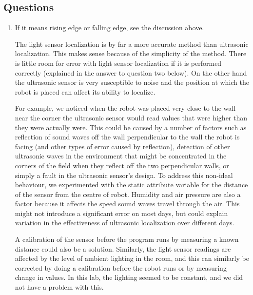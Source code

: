 \documentclass[twocolumn]{article}
\begin{document}

\subsection{Questions}

\begin{enumerate}

\item
If it means rising edge or falling edge, see the discussion above.

The light sensor localization is by far a more accurate method than ultrasonic localization. This makes sense because of the simplicity of the method. There is little room for error with light sensor localization if it is performed correctly (explained in the answer to question two below). On the other hand the ultrasonic sensor is very susceptible to noise and the position at which the robot is placed can affect its ability to localize.

For example, we noticed when the robot was placed very close to the wall near the corner the ultrasonic sensor would read values that were higher than they were actually were. This could be caused by a number of factors such as reflection of sound waves off the wall perpendicular to the wall the robot is facing (and other types of error caused by reflection), detection of other ultrasonic waves in the environment that might be concentrated in the corners of the field when they reflect off the two perpendicular walls, or simply a fault in the ultrasonic sensor's design. To address this non-ideal behaviour, we experimented with the static attribute variable for the distance of the sensor from the centre of robot. Humidity and air pressure are also a factor because it affects the speed sound waves travel through the air. This might not introduce a significant error on most days, but could explain variation in the effectiveness of ultrasonic localization over different days.%

A calibration of the sensor before the program runs by measuring a known distance could also be a solution. Similarly, the light sensor readings are affected by the level of ambient lighting in the room, and this can similarly be corrected by doing a calibration before the robot runs or by measuring change in values. In this lab, the lighting seemed to be constant, and we did not have a problem with this.


\end{enumerate}
\end{document}
